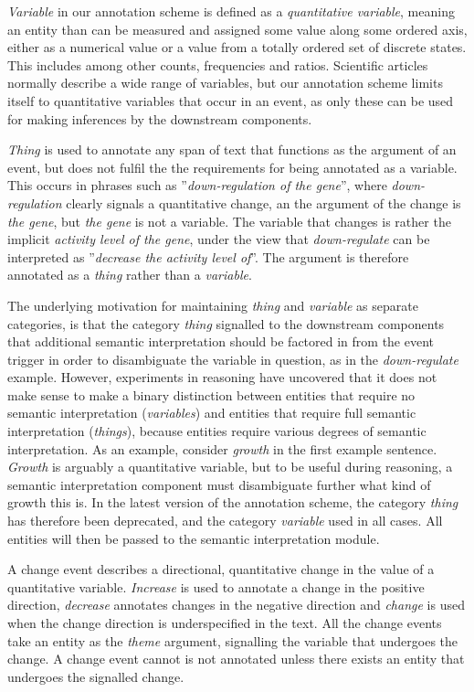 \emph{Variable} in our annotation scheme is defined as a \emph{quantitative variable}, meaning an entity than can be measured and assigned some value along some ordered axis, either as a numerical value or a value from a totally ordered set of discrete states. This includes among other counts, frequencies and ratios. Scientific articles normally describe a wide range of variables, but our annotation scheme limits itself to quantitative variables that occur in an event, as only these can be used for making inferences by the downstream components. 

\emph{Thing} is used to annotate any span of text that functions as the argument of an event, but does not fulfil the the requirements for being annotated as a variable. This occurs in phrases such as ''\emph{down-regulation of the gene}'', where \emph{down-regulation} clearly signals a quantitative change, an the argument of the change is \emph{the gene}, but \emph{the gene} is not a variable. The variable that changes is rather the implicit \emph{activity level of the gene}, under the view that \emph{down-regulate} can be interpreted as ''\emph{decrease the activity level of}''. The argument is therefore annotated as a \emph{thing} rather than a \emph{variable}.

The underlying motivation for maintaining \emph{thing} and \emph{variable} as separate categories, is that the category \emph{thing} signalled to the downstream components that additional semantic interpretation should be factored in from the event trigger in order to disambiguate the variable in question, as in the \emph{down-regulate} example. However, experiments in reasoning have uncovered that it does not make sense to make a binary distinction between entities that require no semantic interpretation (\emph{variables}) and entities that require full semantic interpretation (\emph{things}), because entities require various degrees of semantic interpretation. As an example, consider \emph{growth} in the first example sentence. \emph{Growth} is arguably a quantitative variable, but to be useful during reasoning, a semantic interpretation component must disambiguate further what kind of growth this is. In the latest version of the annotation scheme, the category \emph{thing} has therefore been deprecated, and the category \emph{variable} used in all cases. All entities will then be passed to the semantic interpretation module.

A change event describes a directional, quantitative change in the value of a quantitative variable. \emph{Increase} is used to annotate a change in the positive direction, \emph{decrease} annotates changes in the negative direction and \emph{change} is used when the change direction is underspecified in the text. All the change events take an entity as the \emph{theme} argument, signalling the variable that undergoes the change. A change event cannot is not annotated unless there exists an entity that undergoes the signalled change.

